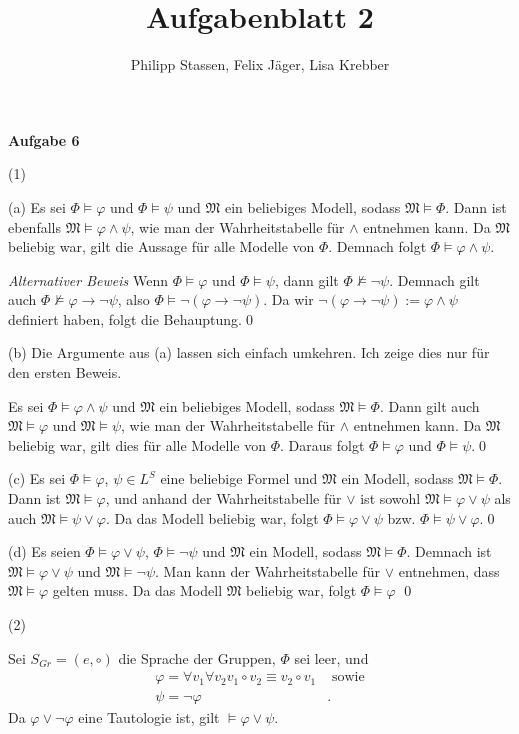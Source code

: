 \documentclass{article}
\title{Aufgabenblatt 2}
\author{Philipp Stassen, Felix Jäger, Lisa Krebber}
\newcommand{\model}{\mathfrak{M}}
\theoremstyle{definition}
\theoremstyle{plain}
\theoremstyle{remark}
\newcommand{\aufgabe}[1]{
	{
		\vspace*{0.5cm}
		\textsf{\textbf{Aufgabe #1}}
		\vspace*{0.2cm}

	}
}
\newcommand{\unteraufgabe}[1]{
	{
		\vspace*{0.2cm}
\noindent\textsf{(#1)}
}
}
\newcommand{\teilaufgabe}[1]{
	{
\noindent 
\vspace*{0.2cm}
\hspace*{0,1 cm}
\textsf{(#1)}
}
}
\begin{document}
\maketitle
\aufgabe6
\unteraufgabe{1}

\teilaufgabe{a} Es sei $\Phi\vDash \varphi$ und $\Phi\vDash\psi$ und $\mathfrak{M}$ ein beliebiges Modell, sodass $\model \vDash \Phi$. Dann ist ebenfalls $\model \vDash \varphi \wedge \psi$, wie man der Wahrheitstabelle für $\wedge$ entnehmen kann. Da $\model$ beliebig war, gilt die Aussage für alle Modelle von $\Phi$. Demnach folgt $\Phi\vDash \varphi\wedge \psi$.

\emph{Alternativer Beweis} Wenn $\Phi\vDash\varphi$ und $\Phi\vDash\psi$, dann gilt $\Phi\nvDash \neg\psi$. Demnach gilt auch $\Phi\nvDash\varphi\to\neg\psi$, also $\Phi\vDash\neg(\varphi\to\neg\psi)$. Da wir $\neg(\varphi\to\neg\psi):=\varphi\wedge\psi$ definiert haben, folgt die Behauptung.\qed

\teilaufgabe{b} Die Argumente aus \textsf{(a)} lassen sich einfach umkehren. Ich zeige dies nur für den ersten Beweis.

Es sei $\Phi\vDash\varphi\wedge\psi$ und $\model$ ein beliebiges Modell, sodass $\model\vDash\Phi$. Dann gilt auch $\model\vDash \varphi$ und $\model\vDash \psi$, wie man der Wahrheitstabelle für $\wedge$ entnehmen kann. Da $\model$ beliebig war, gilt dies für alle Modelle von $\Phi$. Daraus folgt $\Phi\vDash \varphi$ und $\Phi\vDash\psi$.\qed

\teilaufgabe{c} Es sei $\Phi\vDash\varphi$, $\psi\in L^S$ eine beliebige Formel und $\model$ ein Modell, sodass $\model\vDash\Phi$. Dann ist $\model\vDash \varphi$, und anhand der Wahrheitstabelle für $\vee$ ist sowohl $\model\vDash\varphi\vee\psi$ als auch $\model\vDash\psi\vee\varphi$. Da das Modell beliebig war, folgt $\Phi\vDash\varphi\vee\psi$ bzw. $\Phi\vDash\psi\vee\varphi$.\qed

\teilaufgabe{d} Es seien $\Phi\vDash\varphi\vee\psi$, $\Phi\vDash\neg\psi$ und $\model$ ein Modell, sodass $\model\vDash\Phi$. Demnach ist $\model\vDash\varphi\vee\psi$ und $\model\vDash\neg\psi$. Man kann der Wahrheitstabelle für $\vee$ entnehmen, dass $\model\vDash\varphi$ gelten muss. Da das Modell $\model$ beliebig war, folgt $\Phi\vDash\varphi$ \qed

\unteraufgabe2
Sei $S_{Gr}=(e,\circ)$ die Sprache der Gruppen, $\Phi$ sei leer, und
\begin{align}
	\varphi=\forall v_1\forall v_2 v_1\circ v_2\equiv v_2\circ v_1& \textrm{ sowie}\\
	\psi=\neg\varphi&.
\end{align}
Da $\varphi\vee\neg\varphi$ eine Tautologie ist, gilt $\vDash \varphi\vee\psi$.
\end{document}
